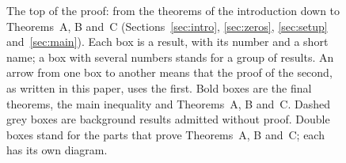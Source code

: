 \begin{figure}[tbp]
\caption{The top of the proof: from the theorems of the introduction down to Theorems~A, B
and~C (Sections~\ref{sec:intro}, \ref{sec:zeros}, \ref{sec:setup} and~\ref{sec:main}). Each box
is a result, with its number and a short name; a box with several numbers stands for a group of
results. An arrow from one box to another means that the proof of the second, as written in this
paper, uses the first. Bold boxes are the final theorems,
the main inequality and Theorems~A, B and~C. Dashed grey boxes are background results admitted
without proof. Double boxes stand for the parts that prove Theorems~A, B and~C; each has its own
diagram.}
\label{fig:overview}
\end{figure}
